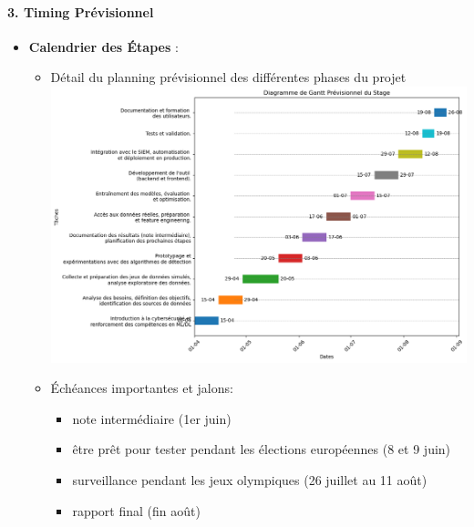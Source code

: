 \documentclass[
  letterpaper,
  DIV=11,
  numbers=noendperiod]{scrartcl}
\let\oldparagraph\paragraph
\renewcommand{\paragraph}[1]{\oldparagraph{#1}\mbox{}}
\providecommand{\tightlist}{%
  \setlength{\itemsep}{0pt}\setlength{\parskip}{0pt}}\usepackage{longtable,booktabs,array}
\begin{document}
\paragraph{3. Timing Prévisionnel}\label{timing-pruxe9visionnel}

\begin{itemize}
\tightlist
\item
  \textbf{Calendrier des Étapes} :

  \begin{itemize}
  \tightlist
  \item
    Détail du planning prévisionnel des différentes phases du projet
    \includegraphics{images/gantt_prevision.png}
  \item
    Échéances importantes et jalons:

    \begin{itemize}
    \tightlist
    \item
      note intermédiaire (1er juin)
    \item
      être prêt pour tester pendant les élections européennes (8 et 9
      juin)
    \item
      surveillance pendant les jeux olympiques (26 juillet au 11 août)
    \item
      rapport final (fin août)
    \end{itemize}
  \end{itemize}
\end{itemize}
\end{document}

